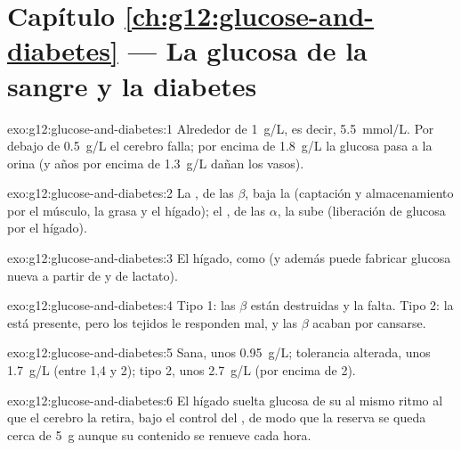\section*{Capítulo \ref{ch:g12:glucose-and-diabetes} --- La glucosa de la sangre y la diabetes}

\begin{solution}{exo:g12:glucose-and-diabetes:1}
Alrededor de \qty{1}{g/L}, es decir, \qty{5.5}{mmol/L}. Por debajo de
\qty{0.5}{g/L} el cerebro falla; por encima de \qty{1.8}{g/L} la
glucosa pasa a la orina (y años por encima de \qty{1.3}{g/L} dañan los
vasos).
\end{solution}

\begin{solution}{exo:g12:glucose-and-diabetes:2}
La , de las  $\beta$, baja la  (captación y
almacenamiento por el músculo, la grasa y el hígado); el , de
las  $\alpha$, la sube (liberación de glucosa por el hígado).
\end{solution}

\begin{solution}{exo:g12:glucose-and-diabetes:3}
El hígado, como  (y además puede fabricar glucosa nueva a
partir de  y de lactato).
\end{solution}

\begin{solution}{exo:g12:glucose-and-diabetes:4}
Tipo 1: las  $\beta$ están destruidas y la  falta. Tipo
2: la  está presente, pero los tejidos le responden mal, y las
 $\beta$ acaban por cansarse.
\end{solution}

\begin{solution}{exo:g12:glucose-and-diabetes:5}
Sana, unos \qty{0.95}{g/L}; tolerancia alterada, unos \qty{1.7}{g/L}
(entre 1,4 y 2); tipo 2, unos \qty{2.7}{g/L} (por encima de 2).
\end{solution}

\begin{solution}{exo:g12:glucose-and-diabetes:6}
El hígado suelta glucosa de su  al mismo ritmo al que el
cerebro la retira, bajo el control del , de modo que la reserva
se queda cerca de \qty{5}{g} aunque su contenido se renueve cada hora.
\end{solution}

